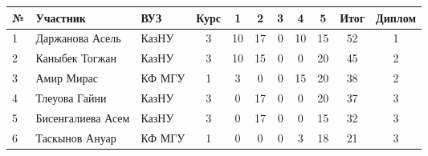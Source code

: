\begin{center}
\begin{tabular}{|l|l|l|c|c|c|c|c|c|c|c|}
\hline
№ & Участник & ВУЗ & Курс & 1 & 2 & 3 & 4 & 5  & Итог & Диплом \\
\hline
1 & Даржанова Асель & КазНУ & 3 & 10 & 17 & 0 & 10 & 15 & 52 & 1 \\
\hline
2 & Каныбек Тогжан & КазНУ & 3 & 10 & 15 & 0 & 0 & 20 & 45 & 2 \\
\hline
3 & Амир Мирас & КФ МГУ & 1 & 3 & 0 & 0 & 15 & 20 & 38 & 2 \\
\hline
4 & Тлеуова Гайни & КазНУ & 3 & 0 & 17 & 0 & 0 & 20 & 37 & 3 \\
\hline
5 & Бисенгалиева Асем & КазНУ & 3 & 0 & 17 & 0 & 0 & 15 & 32 & 3 \\
\hline
6 & Таскынов Ануар & КФ МГУ & 1 & 0 & 0 & 0 & 3 & 18 & 21 & 3 \\
\hline
\end{tabular}
\end{center}
